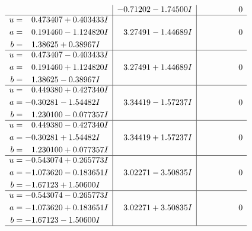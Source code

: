 \documentclass[1p]{elsarticle_modified}
\theoremstyle{definition}
\begin{document}
$$\begin{array}{c|c|c}
 & -0.71202 - 1.74500 I & \phantom{-0.000000 } 0 \\ \hline\begin{aligned}
u &= \phantom{-}0.473407 + 0.403433 I \\
a &= \phantom{-}0.191460 - 1.124820 I \\
b &= \phantom{-}1.38625 + 0.38967 I\end{aligned}
 & \phantom{-}3.27491 - 1.44689 I & \phantom{-0.000000 } 0 \\ \hline\begin{aligned}
u &= \phantom{-}0.473407 - 0.403433 I \\
a &= \phantom{-}0.191460 + 1.124820 I \\
b &= \phantom{-}1.38625 - 0.38967 I\end{aligned}
 & \phantom{-}3.27491 + 1.44689 I & \phantom{-0.000000 } 0 \\ \hline\begin{aligned}
u &= \phantom{-}0.449380 + 0.427340 I \\
a &= -0.30281 - 1.54482 I \\
b &= \phantom{-}1.230100 - 0.077357 I\end{aligned}
 & \phantom{-}3.34419 - 1.57237 I & \phantom{-0.000000 } 0 \\ \hline\begin{aligned}
u &= \phantom{-}0.449380 - 0.427340 I \\
a &= -0.30281 + 1.54482 I \\
b &= \phantom{-}1.230100 + 0.077357 I\end{aligned}
 & \phantom{-}3.34419 + 1.57237 I & \phantom{-0.000000 } 0 \\ \hline\begin{aligned}
u &= -0.543074 + 0.265773 I \\
a &= -1.073620 - 0.183651 I \\
b &= -1.67123 + 1.50600 I\end{aligned}
 & \phantom{-}3.02271 - 3.50835 I & \phantom{-0.000000 } 0 \\ \hline\begin{aligned}
u &= -0.543074 - 0.265773 I \\
a &= -1.073620 + 0.183651 I \\
b &= -1.67123 - 1.50600 I\end{aligned}
 & \phantom{-}3.02271 + 3.50835 I & \phantom{-0.000000 } 0\\
 \hline 
 \end{array}$$\newpage$$\begin{array}{c|c|c}  

\end{array}$$
\end{document}
